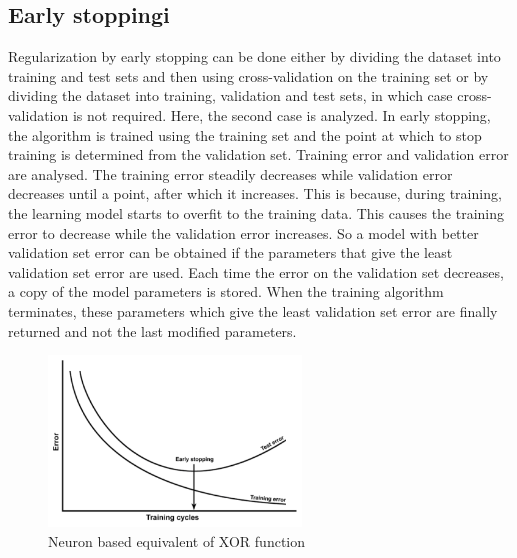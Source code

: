 \subsection{Early stoppingi}
Regularization by early stopping can be done either by dividing the dataset into training and test 
sets and then using cross-validation on the training set or by dividing the dataset into training, 
validation and test sets, in which case cross-validation is not required.
Here, the second case is analyzed. In early stopping, the algorithm is trained using the
training set and the point at which to stop training is determined from the validation set. 
Training error and validation error are analysed. The training error steadily decreases while 
validation error decreases until a point, after which it increases. 
This is because, during training, the learning model starts to overfit to the training data. 
This causes the training error to decrease while the validation error increases.
So a model with better validation set error can be obtained if the parameters that give the least
validation set error are used.
Each time the error on the validation set decreases, a copy of the model parameters is stored.
When the training algorithm terminates, these parameters which give the least validation set
error are finally returned and not the last modified parameters. 
\begin{figure}[htb] 
	\label{fig:early_stop}
	\centering
	\includegraphics[width=0.6\textwidth]{figures/early_stop}
	\caption{Neuron based equivalent of XOR function}
\end{figure}

